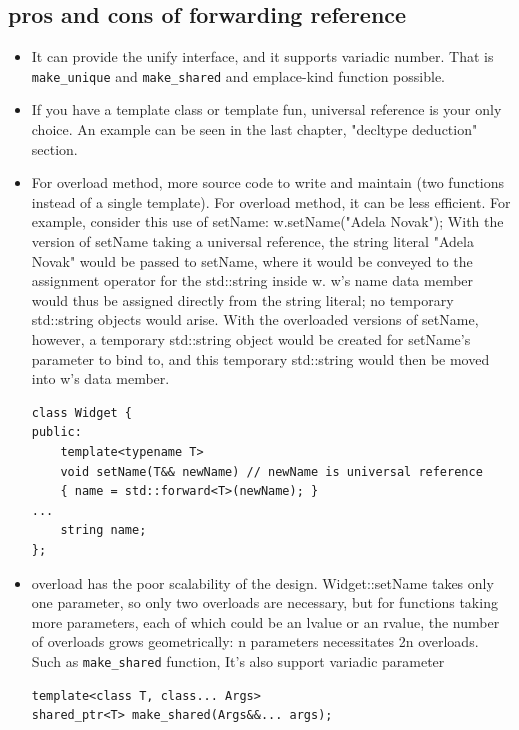 \documentclass[a4paper,11pt,twoside]{book}
\begin{document}
\subsection{pros and cons of forwarding reference}
\begin{itemize}

\item It can provide the unify interface, and it supports variadic number. That is \texttt{make\_unique} and \texttt{make\_shared} and emplace-kind function possible.

\item If you have a template class or template fun, universal reference is your only choice. An example can be seen in the last chapter, "decltype deduction" section.

\item For overload method, more source code to write and maintain (two functions instead of a single template). For overload method, it can be less efficient. For example, consider this use of setName: w.setName("Adela Novak"); With the version of setName taking a universal reference, the string literal "Adela Novak" would be passed to setName, where it would be conveyed to the assignment operator for the std::string inside w. w's name data member would thus be assigned directly from the string literal; no temporary std::string objects would arise. With the overloaded versions of setName, however, a temporary std::string object would be created for setName's parameter to bind to, and this temporary std::string would then be moved into w's data member.

\begin{lstlisting}[numbers=none]
class Widget {
public:
	template<typename T>
	void setName(T&& newName) // newName is universal reference
	{ name = std::forward<T>(newName); }
...
	string name;    
};
\end{lstlisting}

    \item overload has the poor scalability of the design. Widget::setName takes only one parameter, so only two overloads are necessary, but for functions taking more parameters, each of which could be an lvalue or an rvalue, the number of overloads grows geometrically: n parameters necessitates 2n overloads. Such as \texttt{make\_shared} function, It's also support variadic parameter

\begin{lstlisting}[numbers=none]
template<class T, class... Args> 
shared_ptr<T> make_shared(Args&&... args); 


\end{lstlisting}
\end{itemize}
\end{document}
